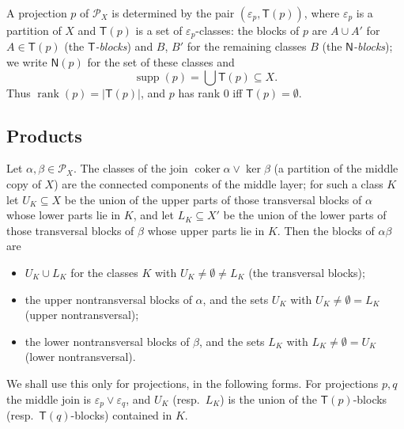 \documentclass[11pt]{amsart}
\theoremstyle{definition}
\renewcommand{\P}{\mathcal{P}}
\newcommand{\supp}{\operatorname{supp}}
\newcommand{\T}{\mathsf{T}}
\newcommand{\N}{\mathsf{N}}
\newcommand{\rk}{\operatorname{rank}}
\begin{document}
A projection $p$ of $\P_X$ is determined by the pair $(\varepsilon_p,\T(p))$, where $\varepsilon_p$ is a partition of $X$ and $\T(p)$ is a set of $\varepsilon_p$-classes: the blocks of $p$ are $A\cup A'$ for $A\in\T(p)$ (the \emph{$\T$-blocks}) and $B$, $B'$ for the remaining classes $B$ (the \emph{$\N$-blocks}); we write $\N(p)$ for the set of these classes and
\[
\supp(p)=\textstyle\bigcup\T(p)\subseteq X .
\]
Thus $\rk(p)=|\T(p)|$, and $p$ has rank $0$ iff $\T(p)=\emptyset$.

\subsection{Products}
Let $\alpha,\beta\in\P_X$. The classes of the join $\operatorname{coker}\alpha\vee\ker\beta$ (a partition of the middle copy of $X$) are the connected components of the middle layer; for such a class $K$ let $U_K\subseteq X$ be the union of the upper parts of those transversal blocks of $\alpha$ whose lower parts lie in $K$, and let $L_K\subseteq X'$ be the union of the lower parts of those transversal blocks of $\beta$ whose upper parts lie in $K$. Then the blocks of $\alpha\beta$ are
\begin{itemize}[nosep]
\item $U_K\cup L_K$ for the classes $K$ with $U_K\ne\emptyset\ne L_K$ (the transversal blocks);
\item the upper nontransversal blocks of $\alpha$, and the sets $U_K$ with $U_K\ne\emptyset=L_K$ (upper nontransversal);
\item the lower nontransversal blocks of $\beta$, and the sets $L_K$ with $L_K\ne\emptyset=U_K$ (lower nontransversal).
\end{itemize}
We shall use this only for projections, in the following forms. For projections $p,q$ the middle join is $\varepsilon_p\vee\varepsilon_q$, and $U_K$ (resp.\ $L_K$) is the union of the $\T(p)$-blocks (resp.\ $\T(q)$-blocks) contained in $K$.
\end{document}
